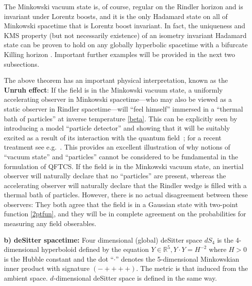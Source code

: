 \documentclass[12pt]{article}
\newcommand{\RR}{\mathbb{R}}
\theoremstyle{plain}
\theoremstyle{definition}
\begin{document}
The Minkowski vacuum state is, of course, regular on the Rindler horizon and is invariant under Lorentz boosts, and it is the only Hadamard state on all of Minkowski spacetime that is Lorentz boost invariant. In fact, the uniqueness and KMS property (but not necessarily existence) of an isometry invariant Hadamard state can be proven to hold on any globally hyperbolic spacetime with a bifurcate Killing horizon \cite{kaywald}. Important further examples will be provided in the next two subsections.

The above theorem has an important physical interpretation, known as the {\bf Unruh effect}: If the field is in the Minkowski vacuum state, a uniformly accelerating observer in Minkowski spacetime---who may also be viewed as a static observer in Rindler spacetime---will ``feel himself'' immersed in a ``thermal bath of particles'' at inverse temperature \eqref{beta}. This can be explicitly seen by introducing a model ``particle detector'' and showing that it
will be suitably excited as a result of its interaction with the quantum field~\cite{unruh1}; for a recent treatment see e.g.~\cite{bievre}. This provides an excellent illustration of
why notions of ``vacuum state'' and ``particles'' cannot be considered to be fundamental in the formulation of
QFTCS. If the field is in the Minkowski vacuum state, an inertial observer will naturally declare that no ``particles'' are present,
whereas the accelerating observer will naturally declare that the Rindler wedge is filled with a thermal bath of particles.
However, there is no actual disagreement between these observers: They both agree that the field is in a Gaussian
state with two-point function \eqref{2ptfun}, and they will be in complete agreement on the probabilities for
measuring any field obserables.

\vspace{.5cm}
%
{\bf b) deSitter spacetime:}
%
Four dimensional (global) deSitter space $dS_4$ is the 4-dimensional hyperboloid
defined by the equation $Y \in \RR^5, Y \cdot Y = H^{-2}$ where $H >0$ is the
Hubble constant and the dot ``$\cdot$'' denotes the 5-dimensional Minkowskian
inner product with signature $(-++++)$. The metric is that induced
from the ambient space. $d$-dimensional deSitter space is defined in the same way.
\end{document}
